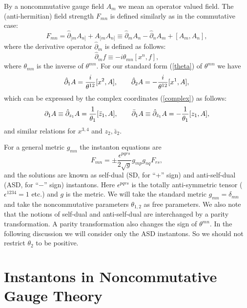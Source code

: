 \documentclass[a4paper,a4paper]{article}
\begin{document}
By a noncommutative gauge field $A_m$ we mean an operator valued
field. The (anti-hermitian) field strength $F_{mn}$ is defined
similarly as in the commutative case:
\begin{equation}
\label{F by A}
F_{mn}=\hat\partial_{[m} A_{n]} + A_{[m} A_{n]}
\equiv \hat\partial_m A_n - \hat\partial_n A_m + [A_m, A_n],
\end{equation}
where the derivative operator $\hat\partial_m$ is defined as follows:
\begin{equation}
\hat\partial_m f \equiv - i \theta_{mn} [x^n, f],
\end{equation}
where $\theta_{mn}$ is the inverse of $\theta^{mn}$.
For our standard form (\ref{theta}) of $\theta^{mn}$ we have
\begin{equation}
\hat\partial_1 A = {i \over \theta^{12}} [x^2,A],
\qquad \hat\partial_2 A = - {i \over \theta^{12}} [x^1,A],
\end{equation}
which can be expressed by the complex coordinates (\ref{complex}) as
follows:
\begin{equation}
\partial_1 A \equiv \hat
\partial_{z_1} A = {1\over \theta_1} [\bar z_1, A],
\qquad \bar\partial_1 A \equiv \hat\partial_{\bar z_1} A
= - {1\over \theta_1} [z_1, A],
\end{equation}
and similar relations for $x^{3,4}$ and $z_2,\bar{z}_2$.

For a general metric $g_{mn}$ the instanton equations are
\begin{equation}
\label{instanton}
F_{mn}=\pm\frac{\epsilon^{pqrs}}{2\sqrt{g}}g_{mp}g_{nq}F_{rs},
\end{equation}
and the solutions are known as self-dual (SD, for ``+'' sign) and
anti-self-dual (ASD, for ``$-$'' sign) instantons. Here
$\epsilon^{pqrs}$ is the totally anti-symmetric tensor
($\epsilon^{1234}=1$ etc.) and $g$ is the metric. We will
take the standard metric $g_{mn}=\delta_{mn}$ and take the
noncommutative parameters $\theta_{1,2}$ as free parameters. We
also note that the notions of self-dual and anti-self-dual are
interchanged by a parity transformation. A parity transformation
also changes the sign of $\theta^{mn}$. In the following
discussion we will consider only the ASD instantons. So we should
not restrict $\theta_2$ to be positive.

\section{Instantons in Noncommutative Gauge Theory}
\end{document}
